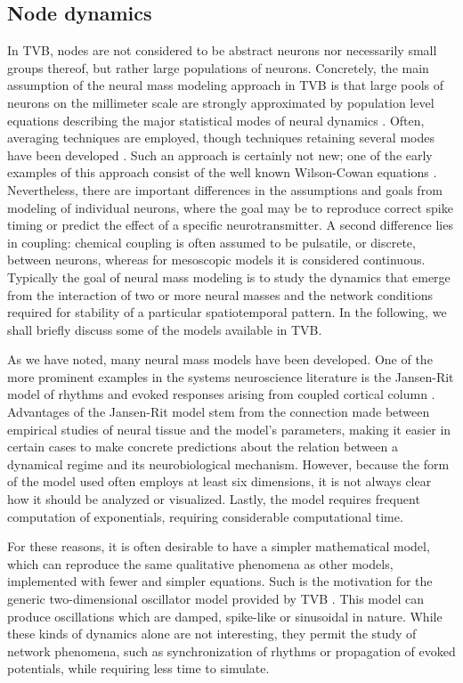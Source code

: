 \documentclass{bioinfo}
\begin{document}
\subsection{Node dynamics}

	In TVB, nodes are not considered to be abstract neurons nor necessarily
	small groups thereof, but rather large populations of neurons. Concretely,
	the main assumption of the neural mass modeling approach in TVB is that
	large pools of neurons on the millimeter scale are strongly approximated
	by population level equations describing the major statistical modes of
	neural dynamics \citep{Freeman_1975book}. Often, averaging techniques are
	employed, though techniques retaining several modes have been developed
	\citep{Stefanescu_2008, Stefanescu_2011}. Such an approach is certainly not
	new; one of the early examples of this approach consist of the well known
	Wilson-Cowan equations \citep{Wilson_1973}. Nevertheless, there are
	important differences in the assumptions and goals from modeling of
	individual neurons, where the goal may be to reproduce correct spike
	timing or predict the effect of  a specific neurotransmitter. A second
	difference lies in coupling: chemical coupling is often assumed to be
	pulsatile, or discrete, between neurons, whereas for mesoscopic models it is considered
	continuous. Typically the goal of neural mass modeling is to study the
	dynamics that emerge from the interaction of two or more neural masses and
	the network conditions required for stability of a particular
	spatiotemporal pattern. In the following, we shall  briefly discuss some
	of the models available in TVB.

	As we have noted, many neural mass models have been developed. One of
	the more prominent examples in the systems neuroscience literature is 
	the Jansen-Rit model of rhythms and evoked responses arising from
	coupled cortical column \citep{Zetterberg_1978, Jansen_1995,David_2004, Spiegler_2010}. 
	Advantages of the Jansen-Rit model stem from the connection made
	between empirical studies of neural tissue and the model's parameters, 
	making it easier in certain cases to make concrete predictions about
	the relation between a dynamical regime and its neurobiological 
	mechanism. However, because the form of the model used often employs
	at least six dimensions, it is not always clear how it should be analyzed or
	visualized. Lastly, the model requires frequent computation of exponentials,
	requiring considerable computational time. 

	For these reasons, it is often desirable to have a simpler mathematical 
	model, which can reproduce the same qualitative phenomena as other 
	models, implemented with fewer and simpler equations. Such is the motivation
	for the generic two-dimensional oscillator model 
    provided by TVB 
    \citep{strogatz2001nonlinear, guckenheimer1983nonlinear}.
	This model can produce oscillations which are damped, spike-like or 
	sinusoidal in nature. While these kinds of dynamics alone are not interesting, they 
	permit the study of network phenomena, such as synchronization of rhythms
	or propagation of evoked potentials, while requiring less time to simulate.
\end{document}
